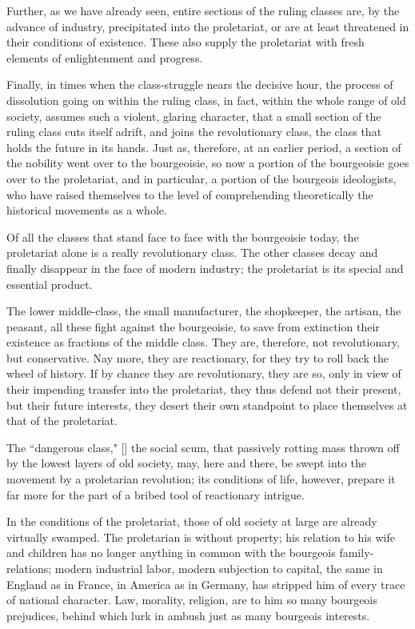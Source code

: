 Further, as we have already seen, entire sections of the ruling classes are, by the advance of industry, precipitated into the proletariat, or are at least threatened in their conditions of existence. These also supply the proletariat with fresh elements of enlightenment and progress.

Finally, in times when the class-struggle nears the decisive hour, the process of dissolution going on within the ruling class, in fact, within the whole range of old society, assumes such a violent, glaring character, that a small section of the ruling class cuts itself adrift, and joins the revolutionary class, the class that holds the future in its hands. Just as, therefore, at an earlier period, a section of the nobility went over to the bourgeoisie, so now a portion of the bourgeoisie goes over to the proletariat, and in particular, a portion of the bourgeois ideologists, who have raised themselves to the level of comprehending theoretically the historical movements as a whole.

Of all the classes that stand face to face with the bourgeoisie today, the proletariat alone is a really revolutionary class. The other classes decay and finally disappear in the face of modern industry; the proletariat is its special and essential product.

The lower middle-class, the small manufacturer, the shopkeeper, the artisan, the peasant, all these fight against the bourgeoisie, to save from extinction their existence as fractions of the middle class. They are, therefore, not revolutionary, but conservative. Nay more, they are reactionary, for they try to roll back the wheel of history. If by chance they are revolutionary, they are so, only in view of their impending transfer into the proletariat, they thus defend not their present, but their future interests, they desert their own standpoint to place themselves at that of the proletariat.

The ``dangerous class," [] the social scum, that passively rotting mass thrown off by the lowest layers of old society, may, here and there, be swept into the movement by a proletarian revolution; its conditions of life, however, prepare it far more for the part of a bribed tool of reactionary intrigue.

In the conditions of the proletariat, those of old society at large are already virtually swamped. The proletarian is without property; his relation to his wife and children has no longer anything in common with the bourgeois family-relations; modern industrial labor, modern subjection to capital, the same in England as in France, in America as in Germany, has stripped him of every trace of national character. Law, morality, religion, are to him so many bourgeois prejudices, behind which lurk in ambush just as many bourgeois interests.

